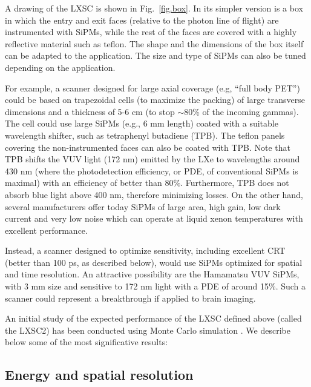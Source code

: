 \documentclass[review]{elsarticle}
\begin{document}
A drawing of the LXSC is shown in Fig.~\ref{fig.box}. In its simpler version is a box in which 
the entry and exit faces (relative to the photon line of flight) are instrumented with SiPMs, while the rest of the faces are covered with a highly reflective material such as teflon. The shape and the dimensions of the box itself can be adapted to the application. The size and type of SiPMs can also be tuned depending on the application.

For example, a scanner designed for large axial coverage (e.g, ``full body PET'') could be based on trapezoidal cells (to maximize the packing) of large transverse dimensions and a thickness of 5-6 cm (to stop $\sim$80\% of the incoming gammas). The cell could use large
SiPMs (e.g., 6 mm length) coated with a suitable wavelength shifter, such as tetraphenyl butadiene (TPB). The teflon panels covering the non-instrumented faces can also be coated with TPB. Note that TPB shifts the VUV light (172 nm) emitted by the LXe  to wavelengths around 430 nm (where the photodetection efficiency, or PDE,  of conventional SiPMs is maximal) with an efficiency of better than 80\%. Furthermore, TPB does not absorb blue light above 400 nm, therefore minimizing losses. On the other hand, several manufacturers offer today SiPMs of large area, high gain, low dark current and very low noise which can operate at liquid xenon temperatures with excellent performance.

Instead, a scanner designed to optimize sensitivity, including excellent CRT (better than 100 ps, as described below), would use SiPMs optimized for spatial and time resolution. An attractive possibility are the Hamamatsu VUV SiPMs, with 3 mm size and sensitive to 172 nm light with a PDE of around 15\%. Such a scanner could represent a breakthrough if applied to brain imaging.  

An initial study of the expected performance of the LXSC defined above (called the LXSC2) has been conducted using Monte Carlo simulation \cite{tfm}. We describe below some of the most significative results:

\subsection{Energy and spatial resolution}
\end{document}
